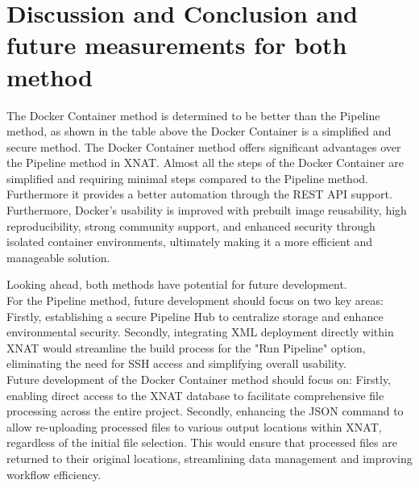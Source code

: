 \section{Discussion and Conclusion and future measurements for both method}



The Docker Container method is determined to be better than the Pipeline method, as shown in the table above the Docker Container is a simplified and secure method.  
The Docker Container method offers significant advantages over the Pipeline method in XNAT.
Almost all the steps of the Docker Container are simplified and requiring minimal steps compared to the Pipeline method. Furthermore it provides a better automation through the REST API support.  Furthermore, Docker's usability is improved with prebuilt image reusability, high reproducibility, strong community support, and enhanced security through isolated container environments, ultimately making it a more efficient and manageable solution.

Looking ahead, both methods have potential for future development.\\
For the Pipeline method, future development should focus on two key areas: Firstly, establishing a secure Pipeline Hub to centralize storage and enhance environmental security. Secondly, integrating XML deployment directly within XNAT would streamline the build process for the "Run Pipeline" option, eliminating the need for SSH access and simplifying overall usability.\\
Future development of the Docker Container method should focus on: Firstly, enabling direct access to the XNAT database to facilitate comprehensive file processing across the entire project. Secondly, enhancing the JSON command to allow re-uploading processed files to various output locations within XNAT, regardless of the initial file selection. This would ensure that processed files are returned to their original locations, streamlining data management and improving workflow efficiency.
